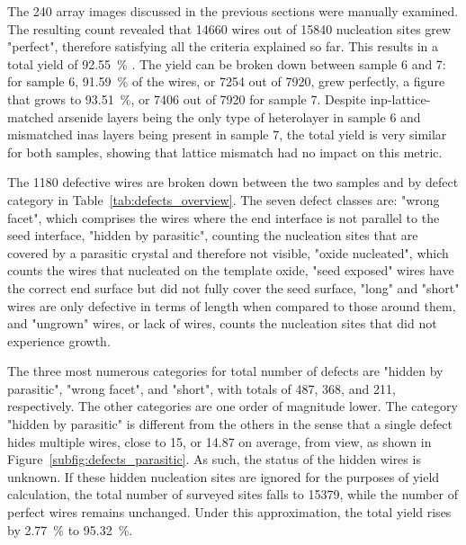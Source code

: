 The \num{240} array images discussed in the previous sections were manually examined. The resulting count revealed that \num{14660} wires out of \num{15840} nucleation sites grew "perfect", therefore satisfying all the criteria explained so far. This results in a total yield of \qty{92.55}{\percent} \cite{Brugnolotto2023_2}. The yield can be broken down between sample 6 and 7: for sample 6, \qty{91.59}{\percent} of the wires, or \num{7254} out of \num{7920}, grew perfectly, a figure that grows to \qty{93.51}{\percent}, or \num{7406} out of \num{7920} for sample 7. Despite \acs{inp}-lattice-matched arsenide layers being the only type of heterolayer in sample 6 and mismatched \acf{inas} layers being present in sample 7, the total yield is very similar for both samples, showing that lattice mismatch had no impact on this metric.

The \num{1180} defective wires are broken down between the two samples and by defect category in Table~\ref{tab:defects_overview}. The seven defect classes are: "wrong facet", which comprises the wires where the end interface is not parallel to the  seed interface, "hidden by parasitic", counting the nucleation sites that are covered by a parasitic crystal and therefore not visible, "oxide nucleated", which counts the wires that nucleated on the template oxide, "seed exposed" wires have the correct end surface but did not fully cover the seed surface, "long" and "short" wires are only defective in terms of length when compared to those around them, and "ungrown" wires, or lack of wires, counts the nucleation sites that did not experience growth.

The three most numerous categories for total number of defects are "hidden by parasitic", "wrong facet", and "short", with totals of \num{487}, \num{368}, and \num{211}, respectively. The other categories are one order of magnitude lower. The category "hidden by parasitic" is different from the others in the sense that a single defect hides multiple wires, close to \num{15}, or \num{14.87} on average, from view, as shown in Figure~\ref{subfig:defects_parasitic}. As such, the status of the hidden wires is unknown. If these hidden nucleation sites are ignored for the purposes of yield calculation, the total number of surveyed sites falls to \num{15379}, while the number of perfect wires remains unchanged. Under this approximation, the total yield rises by \qty{2.77}{\percent} to \qty{95.32}{\percent}.

